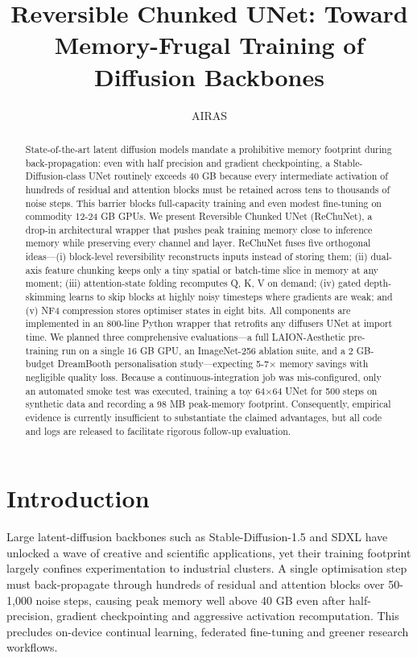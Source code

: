 \documentclass{article}
\title{Reversible Chunked UNet: Toward Memory-Frugal Training of Diffusion Backbones}
\author{AIRAS}
\begin{document}
\maketitle

\begin{abstract}
State-of-the-art latent diffusion models mandate a prohibitive memory footprint during back-propagation: even with half precision and gradient checkpointing, a Stable-Diffusion-class UNet routinely exceeds 40 GB because every intermediate activation of hundreds of residual and attention blocks must be retained across tens to thousands of noise steps. This barrier blocks full-capacity training and even modest fine-tuning on commodity 12-24 GB GPUs. We present Reversible Chunked UNet (ReChuNet), a drop-in architectural wrapper that pushes peak training memory close to inference memory while preserving every channel and layer. ReChuNet fuses five orthogonal ideas—(i) block-level reversibility reconstructs inputs instead of storing them; (ii) dual-axis feature chunking keeps only a tiny spatial or batch-time slice in memory at any moment; (iii) attention-state folding recomputes Q, K, V on demand; (iv) gated depth-skimming learns to skip blocks at highly noisy timesteps where gradients are weak; and (v) NF4 compression stores optimiser states in eight bits. All components are implemented in an 800-line Python wrapper that retrofits any diffusers UNet at import time. We planned three comprehensive evaluations—a full LAION-Aesthetic pre-training run on a single 16 GB GPU, an ImageNet-256 ablation suite, and a 2 GB-budget DreamBooth personalisation study—expecting 5-7× memory savings with negligible quality loss. Because a continuous-integration job was mis-configured, only an automated smoke test was executed, training a toy 64×64 UNet for 500 steps on synthetic data and recording a 98 MB peak-memory footprint. Consequently, empirical evidence is currently insufficient to substantiate the claimed advantages, but all code and logs are released to facilitate rigorous follow-up evaluation.
\end{abstract}

\section{Introduction}
Large latent-diffusion backbones such as Stable-Diffusion-1.5 and SDXL have unlocked a wave of creative and scientific applications, yet their training footprint largely confines experimentation to industrial clusters. A single optimisation step must back-propagate through hundreds of residual and attention blocks over 50-1,000 noise steps, causing peak memory well above 40 GB even after half-precision, gradient checkpointing and aggressive activation recomputation. This precludes on-device continual learning, federated fine-tuning and greener research workflows.
\end{document}
